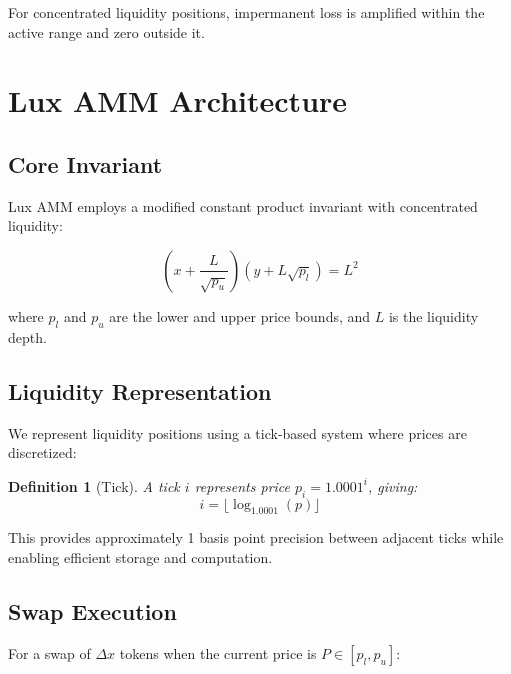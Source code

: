 \documentclass[11pt,a4paper]{article}
\newtheorem{definition}[theorem]{Definition}
\begin{document}
For concentrated liquidity positions, impermanent loss is amplified within the active range and zero outside it.

\section{Lux AMM Architecture}

\subsection{Core Invariant}

Lux AMM employs a modified constant product invariant with concentrated liquidity:

\begin{equation}
    (x + \frac{L}{\sqrt{p_u}})(y + L\sqrt{p_l}) = L^2
\end{equation}

where $p_l$ and $p_u$ are the lower and upper price bounds, and $L$ is the liquidity depth.

\subsection{Liquidity Representation}

We represent liquidity positions using a tick-based system where prices are discretized:

\begin{definition}[Tick]
A tick $i$ represents price $p_i = 1.0001^i$, giving:
\begin{equation}
    i = \lfloor \log_{1.0001}(p) \rfloor
\end{equation}
\end{definition}

This provides approximately 1 basis point precision between adjacent ticks while enabling efficient storage and computation.

\subsection{Swap Execution}

For a swap of $\Delta x$ tokens when the current price is $P \in [p_l, p_u]$:
\end{document}
